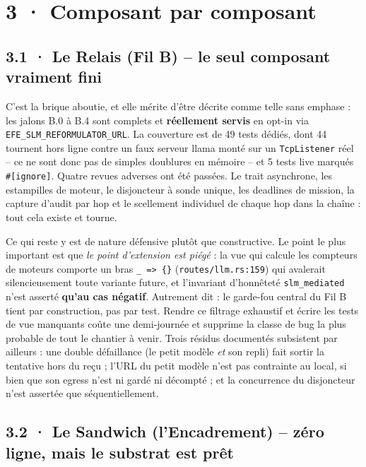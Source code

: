 \documentclass[10pt]{article}
\newcommand{\code}[1]{\texttt{\small #1}}
\begin{document}
\section{3 · Composant par composant}

\subsection{3.1 · Le Relais (Fil B) -- le seul composant vraiment fini}

C'est la brique aboutie, et elle mérite d'être décrite comme telle sans emphase : les jalons B.0 à B.4
sont complets et \textbf{réellement servis} en opt-in via \code{EFE\_SLM\_REFORMULATOR\_URL}. La
couverture est de 49 tests dédiés, dont 44 tournent hors ligne contre un faux serveur llama monté sur
un \code{TcpListener} réel -- ce ne sont donc pas de simples doublures en mémoire -- et 5 tests live
marqués \code{\#[ignore]}. Quatre revues adverses ont été passées. Le trait asynchrone, les estampilles
de moteur, le disjoncteur à sonde unique, les deadlines de mission, la capture d'audit par hop et le
scellement individuel de chaque hop dans la chaîne : tout cela existe et tourne.

Ce qui reste y est de nature défensive plutôt que constructive. Le point le plus important est que
\emph{le point d'extension est piégé} : la vue qui calcule les compteurs de moteurs comporte un bras
\code{\_ => \{\}} (\code{routes/llm.rs:159}) qui avalerait silencieusement toute variante future, et
l'invariant d'honnêteté \code{slm\_mediated} n'est asserté \textbf{qu'au cas négatif}. Autrement dit :
le garde-fou central du Fil B tient par construction, pas par test. Rendre ce filtrage exhaustif et
écrire les tests de vue manquants coûte une demi-journée et supprime la classe de bug la plus probable
de tout le chantier à venir. Trois résidus documentés subsistent par ailleurs : une double défaillance
(le petit modèle \emph{et} son repli) fait sortir la tentative hors du reçu ; l'URL du petit modèle
n'est pas contrainte au local, si bien que son egress n'est ni gardé ni décompté ; et la concurrence
du disjoncteur n'est assertée que séquentiellement.

\subsection{3.2 · Le Sandwich (l'Encadrement) -- zéro ligne, mais le substrat est prêt}
\end{document}
